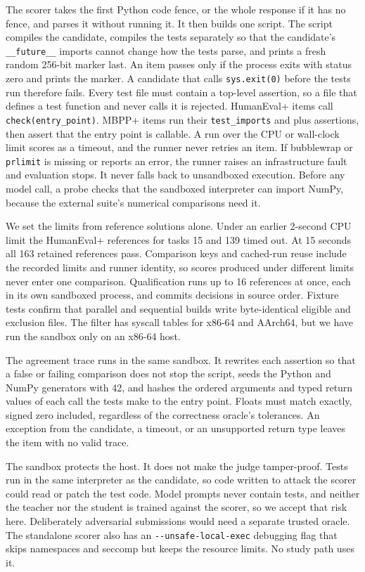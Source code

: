 \documentclass[journal]{IEEEtran}
\begin{document}
The scorer takes the first Python code fence, or the whole response if it has no fence, and parses it without running it. It then builds one script. The script compiles the candidate, compiles the tests separately so that the candidate's \texttt{\_\_future\_\_} imports cannot change how the tests parse, and prints a fresh random 256-bit marker last. An item passes only if the process exits with status zero and prints the marker. A candidate that calls \texttt{sys.exit(0)} before the tests run therefore fails. Every test file must contain a top-level assertion, so a file that defines a test function and never calls it is rejected. HumanEval+ items call \texttt{check(entry\_point)}. MBPP+ items run their \texttt{test\_imports} and plus assertions, then assert that the entry point is callable. A run over the CPU or wall-clock limit scores as a timeout, and the runner never retries an item. If bubblewrap or \texttt{prlimit} is missing or reports an error, the runner raises an infrastructure fault and evaluation stops. It never falls back to unsandboxed execution. Before any model call, a probe checks that the sandboxed interpreter can import NumPy, because the external suite's numerical comparisons need it.

We set the limits from reference solutions alone. Under an earlier 2-second CPU limit the HumanEval+ references for tasks 15 and 139 timed out. At 15 seconds all 163 retained references pass. Comparison keys and cached-run reuse include the recorded limits and runner identity, so scores produced under different limits never enter one comparison. Qualification runs up to 16 references at once, each in its own sandboxed process, and commits decisions in source order. Fixture tests confirm that parallel and sequential builds write byte-identical eligible and exclusion files. The filter has syscall tables for x86-64 and AArch64, but we have run the sandbox only on an x86-64 host.

The agreement trace runs in the same sandbox. It rewrites each assertion so that a false or failing comparison does not stop the script, seeds the Python and NumPy generators with 42, and hashes the ordered arguments and typed return values of each call the tests make to the entry point. Floats must match exactly, signed zero included, regardless of the correctness oracle's tolerances. An exception from the candidate, a timeout, or an unsupported return type leaves the item with no valid trace.

The sandbox protects the host. It does not make the judge tamper-proof. Tests run in the same interpreter as the candidate, so code written to attack the scorer could read or patch the test code. Model prompts never contain tests, and neither the teacher nor the student is trained against the scorer, so we accept that risk here. Deliberately adversarial submissions would need a separate trusted oracle. The standalone scorer also has an \texttt{-{}-unsafe-local-exec} debugging flag that skips namespaces and seccomp but keeps the resource limits. No study path uses it.
\end{document}

